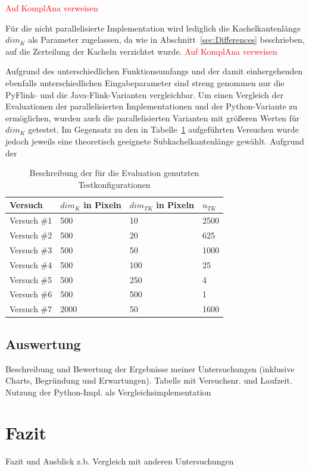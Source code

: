 \textcolor{red}{Auf KomplAna verweisen}

Für die nicht parallelisierte Implementation wird lediglich die Kachelkantenlänge $dim_K$ als Parameter zugelassen, da wie in Abschnitt~\ref{sec:Differences} beschrieben, auf die Zerteilung der Kacheln verzichtet wurde. \textcolor{red}{Auf KomplAna verweisen}

Aufgrund des unterschiedlichen Funktionsumfangs und der damit einhergehenden ebenfalls unterschiedlichen Eingabeparameter sind streng genommen nur die PyFlink- und die Java-Flink-Varianten vergleichbar. Um einen Vergleich der Evaluationen der parallelisierten Implementationen und der Python-Variante zu ermöglichen, wurden auch die parallelisierten Varianten mit größeren Werten für $dim_K$ getestet. Im Gegensatz zu den in Tabelle~\ref{tab:descriptionTestSetting} aufgeführten Versuchen wurde jedoch jeweils eine theoretisch geeignete Subkachelkantenlänge gewählt. Aufgrund der 


\begin{table}[position specifier]
          \centering
          \begin{tabular}{| p{2cm} | p{3cm} | p{3cm} | p{3cm} |}
          	\hline
                  Versuch & $dim_K$ in Pixeln & $dim_{TK}$ in Pixeln & $n_{TK}$ \\
                  \hline
                  Versuch \#1 & 500 & 10 & 2500 \\
                  \hline
                  Versuch \#2 & 500 & 20 & 625 \\
                  \hline
                  Versuch \#3 & 500 & 50 & 1000 \\
                  \hline
                  Versuch \#4 & 500 & 100 & 25 \\
                  \hline
                  Versuch \#5 & 500 & 250 & 4 \\
                  \hline
                  Versuch \#6 & 500 & 500 & 1 \\
                  \hline
                  Versuch \#7 & 2000 & 50 & 1600 \\
                  \hline

          \end{tabular}
          \caption{Beschreibung der für die Evaluation genutzten Testkonfigurationen}
          \label{tab:descriptionTestSetting}
\end{table}

\section{Auswertung}
Beschreibung und Bewertung der Ergebnisse meiner Untersuchungen (inklusive Charts, Begründung und Erwartungen). Tabelle mit Versuchsnr. und  Laufzeit. Nutzung der Python-Impl. als Vergleichsimplementation

\chapter{Fazit}
Fazit und Ausblick
z.b. Vergleich mit anderen Untersuchungen

